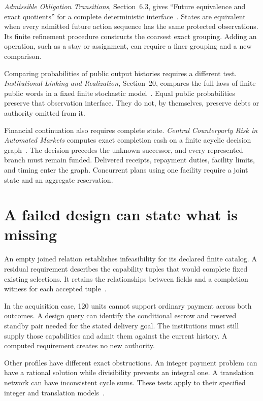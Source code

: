 \documentclass{momentum}
\begin{document}
\emph{Admissible Obligation Transitions}, Section~6.3, gives ``Future equivalence and exact quotients'' for a complete deterministic interface~\cite{transitions}.
States are equivalent when every admitted future action sequence has the same protected observations.
Its finite refinement procedure constructs the coarsest exact grouping.
Adding an operation, such as a stay or assignment, can require a finer grouping and a new comparison.

Comparing probabilities of public output histories requires a different test.
\emph{Institutional Linking and Realization}, Section~20, compares the full laws of finite public words in a fixed finite stochastic model~\cite{linking}.
Equal public probabilities preserve that observation interface.
They do not, by themselves, preserve debts or authority omitted from it.

Financial continuation also requires complete state.
\emph{Central Counterparty Risk in Automated Markets} computes exact completion cash on a finite acyclic decision graph~\cite{risk}.
The decision precedes the unknown successor, and every represented branch must remain funded.
Delivered receipts, repayment duties, facility limits, and timing enter the graph.
Concurrent plans using one facility require a joint state and an aggregate reservation.

\section{A failed design can state what is missing}
\label{sec:obstructions}

An empty joined relation establishes infeasibility for its declared finite catalog.
A residual requirement describes the capability tuples that would complete fixed existing selections.
It retains the relationships between fields and a completion witness for each accepted tuple~\cite[Section~10]{linking}.

In the acquisition case, 120 units cannot support ordinary payment across both outcomes.
A design query can identify the conditional escrow and reserved standby pair needed for the stated delivery goal.
The institutions must still supply those capabilities and admit them against the current history.
A computed requirement creates no new authority.

Other profiles have different exact obstructions.
An integer payment problem can have a rational solution while divisibility prevents an integral one.
A translation network can have inconsistent cycle sums.
These tests apply to their specified integer and translation models~\cite[Sections~13--14]{linking}.
\end{document}
